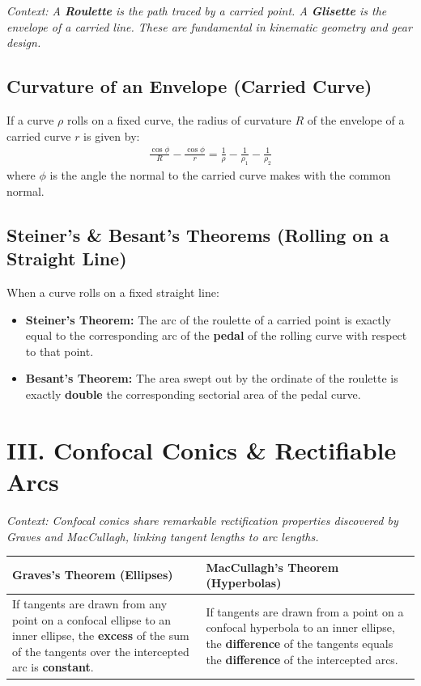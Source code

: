 \documentclass[11pt, a4paper]{article}
\begin{document}
\textit{\small Context: A \textbf{Roulette} is the path traced by a carried point. A \textbf{Glisette} is the envelope of a carried line. These are fundamental in kinematic geometry and gear design.}

\subsection*{\color{secondary} Curvature of an Envelope (Carried Curve)}
If a curve $\rho$ rolls on a fixed curve, the radius of curvature $R$ of the envelope of a carried curve $r$ is given by:
\begin{align*}
    \frac{\cos \phi}{R} - \frac{\cos \phi}{r} = \frac{1}{\rho} - \frac{1}{\rho_1} - \frac{1}{\rho_2}
\end{align*}
where $\phi$ is the angle the normal to the carried curve makes with the common normal.

\subsection*{\color{secondary} Steiner's \& Besant's Theorems (Rolling on a Straight Line)}
When a curve rolls on a fixed straight line:
\begin{itemize}[leftmargin=*, nosep]
    \item \textbf{\color{accent}Steiner's Theorem:} The arc of the roulette of a carried point is exactly equal to the corresponding arc of the \textbf{pedal} of the rolling curve with respect to that point.
    \item \textbf{\color{accent}Besant's Theorem:} The area swept out by the ordinate of the roulette is exactly \textbf{double} the corresponding sectorial area of the pedal curve.
\end{itemize}

\section*{\color{primary} III. Confocal Conics \& Rectifiable Arcs}

\textit{\small Context: Confocal conics share remarkable rectification properties discovered by Graves and MacCullagh, linking tangent lengths to arc lengths.}

\begin{center}
\begin{tabular}{@{}p{} p{}@{}}
\toprule
\textbf{Graves's Theorem (Ellipses)} & \textbf{MacCullagh's Theorem (Hyperbolas)} \\
\midrule
If tangents are drawn from any point on a confocal ellipse to an inner ellipse, the \textbf{excess} of the sum of the tangents over the intercepted arc is \textbf{constant}. & If tangents are drawn from a point on a confocal hyperbola to an inner ellipse, the \textbf{difference} of the tangents equals the \textbf{difference} of the intercepted arcs. \\
\bottomrule
\end{tabular}
\end{center}
\end{document}
